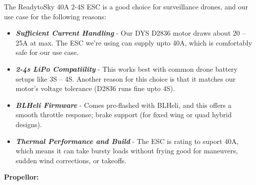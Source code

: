 \documentclass[12pt]{report}
\begin{document}
      The ReadytoSky 40A 2-4S ESC is a good choice for surveillance drones, and our use case for the following reasons:
      \begin{itemize}
        \item \textbf{\textit{Sufficient Current Handling}} - Our DYS D2836 motor draws about 20 -- 25A at max. The ESC we're using can supply upto 40A, which is comfortably safe for our use case.
        \item \textbf{\textit{2-4s LiPo Compatiility}} - This works best with common drone battery setups like 3S -- 4S. Another reason for this choice is that it matches our motor's voltage tolerance (D2836 runs fine upto 4S).
        \item \textbf{\textit{BLHeli Firmware}} - Comes pre-flashed  with BLHeli, and this offers a smooth throttle response; brake support (for fixed wing or quad hybrid designs).
        \item \textbf{\textit{Thermal Performance and Build}} - The ESC is rating to suport 40A, which means it can take bursty loads without frying good for maneuvers, sudden wind corrections, or takeoffs.
      \end{itemize}

      \vspace{0.5cm}
      \noindent \textbf{Propellor: } 
\end{document}
